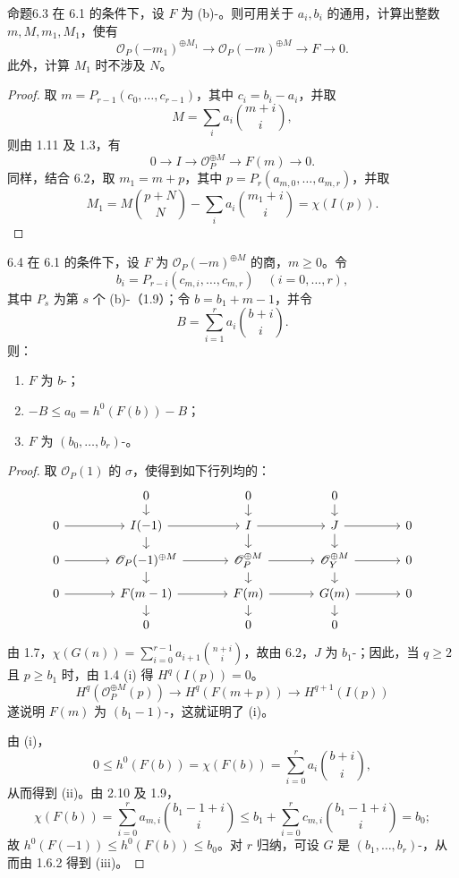 \begin{SGAresult}{命题}{6.3}
在 6.1 的条件下，设 $F$ 为 (b)-。则可用关于 $a_i,b_i$ 的通用，计算出整数 $m,M,m_1,M_1$，使有
\[\mathscr O_P(-m_1)^{\oplus M_1}\longrightarrow\mathscr O_P(-m)^{\oplus M}\longrightarrow F\longrightarrow0.\]
此外，计算 $M_1$ 时不涉及 $N$。
\end{SGAresult}
\begin{proof}
取 $m=P_{r-1}(c_0,\ldots,c_{r-1})$，其中 $c_i=b_i-a_i$，并取
\[M=\sum_i a_i\binom{m+i}{i},\]
则由 1.11 及 1.3，有
\[0\longrightarrow I\longrightarrow\mathscr O_P^{\oplus M}\longrightarrow F(m)\longrightarrow0.\]
同样，结合 6.2，取 $m_1=m+p$，其中 $p=P_r(a_{m,0},\ldots,a_{m,r})$，并取
\[M_1=M\binom{p+N}{N}-\sum_i a_i\binom{m_1+i}{i}=\chi(I(p)).\]
\end{proof}
\begin{SGAresult}{}{6.4}
在 6.1 的条件下，设 $F$ 为 $\mathscr O_P(-m)^{\oplus M}$ 的商，$m\geq0$。令
\[b_i=P_{r-i}(c_{m,i},\ldots,c_{m,r})\quad(i=0,\ldots,r),\]
其中 $P_s$ 为第 $s$ 个 (b)-（1.9）；令 $b=b_1+m-1$，并令
\[B=\sum_{i=1}^r a_i\binom{b+i}{i}.\]
则：
\begin{enumerate}
\item[(i)] $F$ 为 $b$-；
\item[(ii)] $-B\leq a_0=h^0(F(b))-B$；
\item[(iii)] $F$ 为 $(b_0,\ldots,b_r)$-。
\end{enumerate}
\end{SGAresult}
\begin{proof}
取 $\mathscr O_P(1)$ 的 $\sigma$，使得到如下行列均的：
\[
\begin{tikzcd}[column sep=large,row sep=small]
&0\arrow[d]&0\arrow[d]&0\arrow[d]&\\
0\arrow[r]&I(-1)\arrow[r]\arrow[d]&I\arrow[r]\arrow[d]&J\arrow[r]\arrow[d]&0\\
0\arrow[r]&\mathscr O_P(-1)^{\oplus M}\arrow[r]\arrow[d]&\mathscr O_P^{\oplus M}\arrow[r]\arrow[d]&\mathscr O_Y^{\oplus M}\arrow[r]\arrow[d]&0\\
0\arrow[r]&F(m-1)\arrow[r]\arrow[d]&F(m)\arrow[r]\arrow[d]&G(m)\arrow[r]\arrow[d]&0\\
&0&0&0&
\end{tikzcd}
\]
由 1.7，$\chi(G(n))=\sum_{i=0}^{r-1}a_{i+1}\binom{n+i}{i}$，故由 6.2，$J$ 为 $b_1$-；因此，当 $q\geq2$ 且 $p\geq b_1$ 时，由 1.4 (i) 得 $H^q(I(p))=0$。
\[H^q(\mathscr O_P^{\oplus M}(p))\longrightarrow H^q(F(m+p))\longrightarrow H^{q+1}(I(p))\]
遂说明 $F(m)$ 为 $(b_1-1)$-，这就证明了 (i)。

由 (i)，
\[0\leq h^0(F(b))=\chi(F(b))=\sum_{i=0}^r a_i\binom{b+i}{i},\]
从而得到 (ii)。由 2.10 及 1.9，
\[\chi(F(b))=\sum_{i=0}^r a_{m,i}\binom{b_1-1+i}{i}
\leq b_1+\sum_{i=0}^r c_{m,i}\binom{b_1-1+i}{i}=b_0;\]
故 $h^0(F(-1))\leq h^0(F(b))\leq b_0$。对 $r$ 归纳，可设 $G$ 是 $(b_1,\ldots,b_r)$-，从而由 1.6.2 得到 (iii)。
\end{proof}
